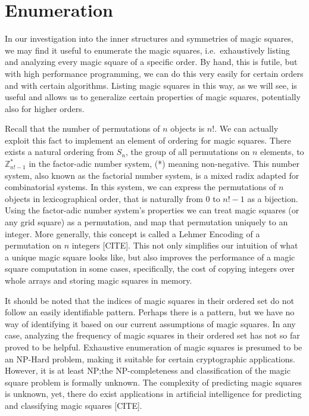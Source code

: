 \documentclass[12pt]{report}
\begin{document}
\section{Enumeration}

\par In our investigation into the inner structures and symmetries of magic squares, we may find it
useful to enumerate the magic squares, i.e.\ exhaustively listing and analyzing every magic square
of a specific order. By hand, this is futile, but with high performance programming, we can do this
very easily for certain orders and with certain algorithms. Listing magic squares in this way, as
we will see, is useful and allows us to generalize certain properties of magic squares, potentially
also for higher orders.

\par Recall that the number of permutations of $n$ objects is $n$!. We can actually exploit this
fact to implement an element of ordering for magic squares. There exists a natural ordering from
$S_n$, the group of all permutations on $n$ elements, to $\mathbb{Z}^{*}_{n!-1}$  in the
factor-adic number system, (*) meaning non-negative. This number system, also known as the
factorial number system, is a mixed radix adapted for combinatorial systems. In this system, we can
express the permutations of $n$ objects in lexicographical order, that is naturally from $0$ to
$n!-1$ as a bijection. Using the factor-adic number system's properties we can treat magic squares
(or any grid square) as a permutation, and map that permutation uniquely to an integer. More
generally, this concept is called a Lehmer Encoding of a permutation on $n$ integers [CITE]. This
not only simplifies our intuition of what a unique magic square looks like, but also improves the
performance of a magic square computation in some cases, specifically, the cost of copying integers
over whole arrays and storing magic squares in memory.

\par It should be noted that the indices of magic squares in their ordered set do not follow an
easily identifiable pattern. Perhaps there is a pattern, but we have no way of identifying it based
on our current assumptions of magic squares. In any case, analyzing the frequency of magic squares
in their ordered set has not so far proved to be helpful. Exhaustive enumeration of magic squares
is presumed to be an NP-Hard problem, making it suitable for certain cryptographic applications.
However, it is at least NP;\@ the NP-completeness and classification of the magic square problem is
formally unknown. The complexity of predicting magic squares is unknown, yet, there do exist
applications in artificial intelligence for predicting and classifying magic squares [CITE].
\end{document}
